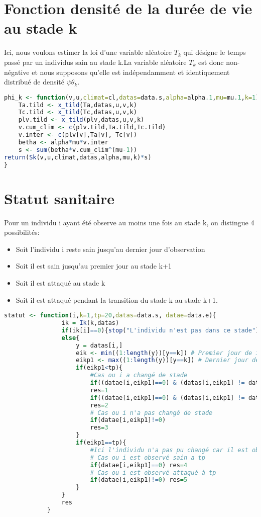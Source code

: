 \documentclass[12pt,a4paper]{scrbook}
\begin{document}
		\section{Fonction densité de la durée de vie au stade k}
Ici, nous voulons estimer la loi d'une variable aléatoire $T_k$ qui désigne le temps passé par un individus sain au stade k.La variable aléatoire $T_k$ est donc non-négative et nous supposons qu'elle est indépendamment et identiquement distribué de densité $\psi\theta_k$.\\
		\begin{lstlisting}[language=R]
phi_k <- function(v,u,climat=cl,datas=data.s,alpha=alpha.1,mu=mu.1,k=1){
	Ta.tild <- x_tild(Ta,datas,u,v,k)
	Tc.tild <- x_tild(Tc,datas,u,v,k)
	plv.tild <- x_tild(plv,datas,u,v,k)
	v.cum_clim <- c(plv.tild,Ta.tild,Tc.tild)
	v.inter <- c(plv[v],Ta[v], Tc[v])
	betha <- alpha*mu*v.inter
	s <- sum(betha*v.cum_clim^(mu-1))
return(Sk(v,u,climat,datas,alpha,mu,k)*s)
}
		\end{lstlisting}	
		\section{Statut sanitaire}
Pour un individu i ayant été observe au moins une fois au stade k, on distingue 4 possibilités:
			\begin{itemize}
				\item Soit l'individu i reste sain jusqu'au dernier jour d'observation
				\item Soit il est sain jusqu'au premier jour au stade k+1
				\item Soit il est attaqué au stade k
				\item Soit il est attaqué pendant la transition du stade k au stade k+1.
			\end{itemize}
		\begin{lstlisting}[language=R]
			statut <- function(i,k=1,tp=20,datas=data.s, datae=data.e){
				ik = Ik(k,datas)
				if(ik[i]==0){stop("L'individu n'est pas dans ce stade")}
				else{
					y = datas[i,]
					eik <- min((1:length(y))[y==k]) # Premier jour de i au stade k
					eikp1 <- max((1:length(y))[y==k]) # Dernier jour de i au stade k
					if(eikp1<tp){
						#Cas ou i a changé de stade
						if((datae[i,eikp1]==0) & (datas[i,eikp1] != datas[i,eikp1+1]) & (datae[i,eikp1+1]==0))
						res=1
						if((datae[i,eikp1]==0) & (datas[i,eikp1] != datas[i,eikp1+1]) &(datae[i,eikp1+1]!=0))
						res=2
						# Cas ou i n'a pas changé de stade
						if(datae[i,eikp1]!=0)
						res=3
					}
					if(eikp1==tp){
						#Ici l'individu n'a pas pu changé car il est observé au stade k à tp
						# Cas ou i est observé sain a tp
						if(datae[i,eikp1]==0) res=4
						# Cas ou i est observé attaqué à tp
						if(datae[i,eikp1]!=0) res=5
					}
				}
				res
			}
			
		\end{lstlisting}
\end{document}
